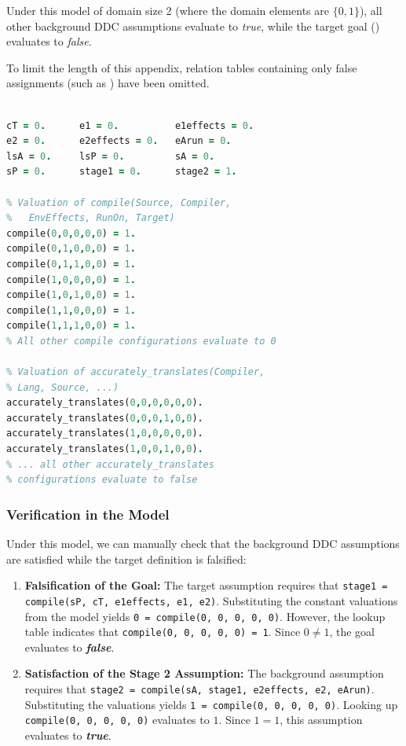 Under this model of domain size 2 (where the domain elements are $\{0, 1\}$), all other background DDC assumptions evaluate to \emph{true}, while the target goal () evaluates to \emph{false}.

To limit the length of this appendix, relation tables containing only false assignments (such as ) have been omitted.

\begin{lstlisting}[language=Prolog, float=tb, caption={Satisfying model for ddc-independence-4.}]
% Interpretation of size 2 {0,1}

cT = 0.      e1 = 0.          e1effects = 0.
e2 = 0.      e2effects = 0.   eArun = 0.
lsA = 0.     lsP = 0.         sA = 0.
sP = 0.      stage1 = 0.      stage2 = 1.

% Valuation of compile(Source, Compiler,
%   EnvEffects, RunOn, Target)
compile(0,0,0,0,0) = 1.
compile(0,1,0,0,0) = 1.
compile(0,1,1,0,0) = 1.
compile(1,0,0,0,0) = 1.
compile(1,0,1,0,0) = 1.
compile(1,1,0,0,0) = 1.
compile(1,1,1,0,0) = 1.
% All other compile configurations evaluate to 0

% Valuation of accurately_translates(Compiler,
% Lang, Source, ...)
accurately_translates(0,0,0,0,0,0).
accurately_translates(0,0,0,1,0,0).
accurately_translates(1,0,0,0,0,0).
accurately_translates(1,0,0,1,0,0).
% ... all other accurately_translates
% configurations evaluate to false
\end{lstlisting}

\subsubsection{Verification in the Model}
Under this model, we can manually check that the background DDC assumptions are satisfied while the target definition is falsified:
\begin{enumerate}
    \item \textbf{Falsification of the Goal:} The target assumption requires that \texttt{stage1 = compile(sP,\allowbreak{} cT,\allowbreak{} e1effects,\allowbreak{} e1,\allowbreak{} e2)}. Substituting the constant valuations from the model yields \texttt{0 = compile(0, 0,\allowbreak{} 0,\allowbreak{} 0, 0)}.
    However, the lookup table indicates that \texttt{compile(0, 0,\allowbreak{} 0,\allowbreak{} 0, 0) = 1}. Since $0 \neq 1$, the goal evaluates to \textbf{\emph{false}}.
    \item \textbf{Satisfaction of the Stage 2 Assumption:} The background assumption requires that \texttt{stage2 =\allowbreak{} compile(sA,\allowbreak{} stage1,\allowbreak{} e2effects, e2,\allowbreak{} eArun)}. Substituting the valuations yields \texttt{1 = compile(0,\allowbreak{} 0,\allowbreak{} 0,\allowbreak{} 0,\allowbreak{} 0)}.
    Looking up \texttt{compile(0,\allowbreak{} 0,\allowbreak{} 0,\allowbreak{} 0,\allowbreak{} 0)} evaluates to $1$. Since $1 = 1$, this assumption evaluates to \textbf{\emph{true}}.
\end{enumerate}

